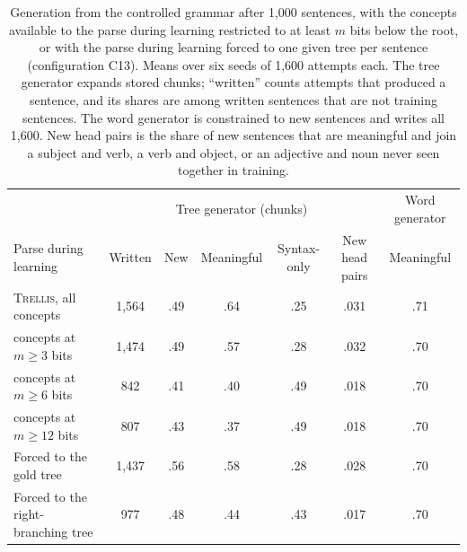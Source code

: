 \documentclass[11pt,letterpaper]{article}
\newcommand{\trellis}{\textsc{Trellis}}
\begin{document}
\begin{table}[!htbp]
\caption{Generation from the controlled grammar after 1,000 sentences, with the concepts available to the parse during learning restricted to at least $m$ bits below the root, or with the parse during learning forced to one given tree per sentence (configuration C13). Means over six seeds of 1,600 attempts each. The tree generator expands stored chunks; ``written'' counts attempts that produced a sentence, and its shares are among written sentences that are not training sentences. The word generator is constrained to new sentences and writes all 1,600. New head pairs is the share of new sentences that are meaningful and join a subject and verb, a verb and object, or an adjective and noun never seen together in training.}
\label{tab:controlled-gen}
\begin{center}
\footnotesize
\setlength{\tabcolsep}{4pt}
\begin{tabular}{lcccccc}
\toprule
 & \multicolumn{5}{c}{Tree generator (chunks)} & Word generator \\
Parse during learning & Written & New & Meaningful & Syntax-only & New head pairs & Meaningful \\
\midrule
\trellis{}, all concepts & 1,564 & .49 & .64 & .25 & .031 & .71 \\
\quad concepts at $m \geq 3$ bits & 1,474 & .49 & .57 & .28 & .032 & .70 \\
\quad concepts at $m \geq 6$ bits & 842 & .41 & .40 & .49 & .018 & .70 \\
\quad concepts at $m \geq 12$ bits & 807 & .43 & .37 & .49 & .018 & .70 \\
Forced to the gold tree & 1,437 & .56 & .58 & .28 & .028 & .70 \\
Forced to the right-branching tree & 977 & .48 & .44 & .43 & .017 & .70 \\
\bottomrule
\end{tabular}
\end{center}
\end{table}
\end{document}
